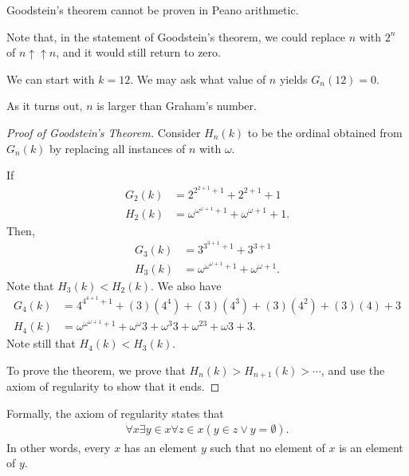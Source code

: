\documentclass[10pt]{mypackage}
\begin{document}
\begin{theorem}
  Goodstein's theorem cannot be proven in Peano arithmetic.
\end{theorem}
Note that, in the statement of Goodstein's theorem, we could replace $n$ with $2^n$ of $n\uparrow\uparrow n$, and it would still return to zero.
\begin{example}
  We can start with $k=12$. We may ask what value of $n$ yields $G_n\left(12\right) = 0$.\newline

  As it turns out, $n$ is larger than Graham's number.
\end{example}
\begin{proof}[Proof of Goodstein's Theorem]
  Consider $H_n(k)$ to be the ordinal obtained from $G_n(k)$ by replacing all instances of $n$ with $\omega$.
  \begin{example}
    If
    \begin{align*}
      G_2(k) &= 2^{2^{2+1}+1}+  2^{2+1} + 1\\
      H_{2}(k) &= \omega^{\omega^{\omega + 1}+1} + \omega^{\omega + 1} + 1.
    \end{align*}
    Then,
    \begin{align*}
      G_3(k) &= 3^{3^{3+1}+1}+  3^{3+1}\\
      H_3(k) &= \omega^{\omega^{\omega + 1}+1} + \omega^{\omega + 1}.
    \end{align*}
    Note that $H_3(k) < H_2(k)$. We also have
    \begin{align*}
      G_4(k) &= 4^{4^{4+1}+1} + \left(3\right)\left(4^{4}\right) + \left(3\right)\left(4^{3}\right) + \left(3\right)\left(4^{2}\right) + \left(3\right)\left(4\right) + 3\\
      H_4(k) &= \omega^{\omega^{\omega + 1} + 1} + \omega^{\omega} 3 + \omega^{3}3 + \omega^23 + \omega 3 + 3.
    \end{align*}
    Note still that $H_4(k) < H_3(k)$.
  \end{example}
  To prove the theorem, we prove that $H_n(k) > H_{n+1}(k) > \cdots$, and use the axiom of regularity to show that it ends.
\end{proof}
\begin{remark}
Formally, the axiom of regularity states that
\begin{align*}
  \forall x \exists y \in x \forall z\in x\left(y\in z \vee y = \emptyset\right).
\end{align*}
In other words, every $x$ has an element $y$ such that no element of $x$ is an element of $y$.
\end{remark}
\end{document}
